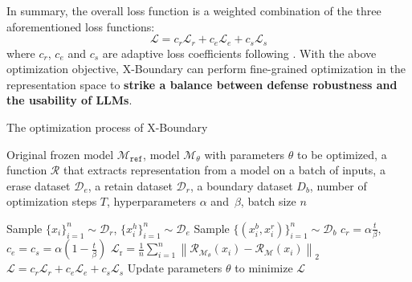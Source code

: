 In summary, the overall loss function is a weighted combination of the three aforementioned loss functions:
\begin{equation}
    \mathcal{L}=c_r\mathcal{L}_r + c_e\mathcal{L}_e + c_s\mathcal{L}_s
\end{equation}
where $c_r$, $c_e$ and $c_s$ are adaptive loss coefficients following \cite{circuit_breaker, adaptive_loss}.
%
With the above optimization objective, X-Boundary can perform fine-grained optimization in the representation space to \textbf{strike a balance between defense robustness and the usability of LLMs}.
%
\begin{algorithm}[tb]
\caption{The optimization process of X-Boundary}
\label{alg:example}
\begin{algorithmic}[1]
    \REQUIRE Original frozen model $\mathcal{M}_{\texttt{ref}}$, model $\mathcal{M}_{\theta}$ with parameters $\theta$ to be optimized, a function $\mathcal{R}$ that extracts representation from a model on a batch of inputs, a erase dataset $\mathcal{D}_e$, a retain dataset $\mathcal{D}_r$, a boundary dataset $D_b$, number of optimization steps $T$, hyperparameters $\alpha$ and~$\beta$, batch size $n$ 
   \begin{spacing}{1.2}
   \STATE Sample $\{x_i\}_{i=1}^n \sim \mathcal{D}_r$, $\{x_i^h\}_{i=1}^n \sim \mathcal{D}_e$
   \STATE Sample $\{(x_i^b,x_i^r)\}_{i=1}^n \sim \mathcal{D}_b$ 
   \STATE $c_r=\alpha \frac{t}{\beta}$, $c_e=c_s=\alpha(1-\frac{t}{\beta})$
   \STATE $\mathcal{L}_\text{r} = \frac{1}{n}\sum_{i=1}^{n} \left\| \mathcal{R}_{\mathcal{M}_\theta} \left(x_i \right) - \mathcal{R}_\mathcal{M} \left(x_i \right) \right\|_2$ %
   \STATE $\mathcal{L}=c_r\mathcal{L}_r + c_e\mathcal{L}_e + c_s\mathcal{L}_s$ %
   \STATE Update parameters $\theta$ to minimize $\mathcal{L}$
   \ENDFOR
   \end{spacing}
\end{algorithmic}
\end{algorithm}

